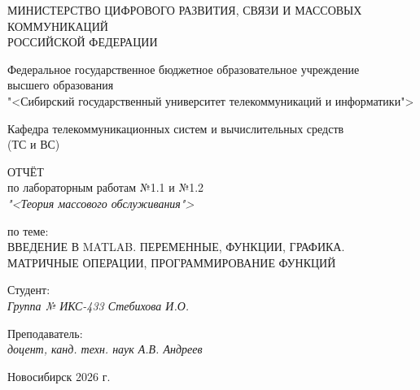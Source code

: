 \thispagestyle{empty}

\begin{center}
    МИНИСТЕРСТВО ЦИФРОВОГО РАЗВИТИЯ, СВЯЗИ И МАССОВЫХ КОММУНИКАЦИЙ \\ РОССИЙСКОЙ ФЕДЕРАЦИИ

    \vspace{20pt}

    Федеральное государственное бюджетное образовательное учреждение  \\  высшего образования \\
    "<Сибирский государственный университет телекоммуникаций и информатики"> \\

    \vspace{20pt}

    Кафедра телекоммуникационных систем и вычислительных средств \\  (ТС и ВС)
\end{center}

\vfill

\begin{center}
    ОТЧЁТ \\
    по лабораторным работам №1.1 и №1.2 \\
    \textit{"<Теория массового обслуживания">}

    \vspace{20pt}

    по теме: \\
    \uppercase{Введение в MATLAB. Переменные, функции, графика. Матричные операции, программирование функций}
\end{center}

\vfill

    \noindent Студент: \\
    \textit{Группа № ИКС-433 \hfill Стебихова И.О.}

    \vspace{20pt}

    \noindent Преподаватель: \\
    \textit{доцент, канд. техн. наук \hfill А.В. Андреев}

\vfill

\begin{center}
    Новосибирск 2026 г.
\end{center}